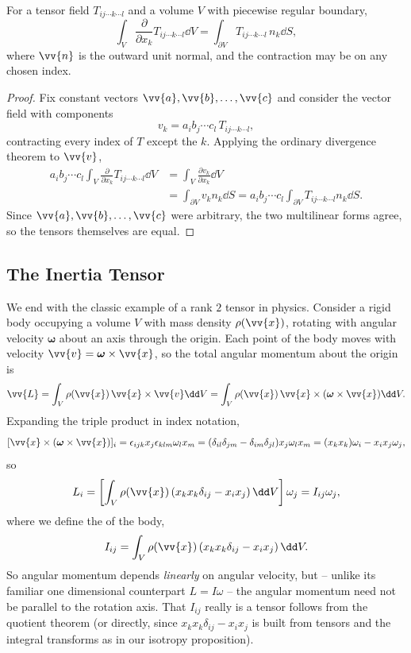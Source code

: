 \begin{theorem}
	For a tensor field $T_{ij \cdots k \cdots l}$ and a volume $V$ with piecewise regular boundary,
	$$
	\int_V \frac{\partial}{\partial x_k} T_{ij\cdots k \cdots l} \dd V = \int_{\partial V} T_{ij \cdots k \cdots l} \, n_k \dd S,
	$$
	where $\vv{n}$ is the outward unit normal, and the contraction may be on any chosen index.
\end{theorem}
\begin{proof}
	Fix constant vectors $\vv{a}, \vv{b}, \dots, \vv{c}$ and consider the vector field with components
	$$
	v_k = a_i b_j \cdots c_l \, T_{ij \cdots k \cdots l},
	$$
	contracting every index of $T$ except the $k$. Applying the ordinary divergence theorem to $\vv{v}$,
	\begin{align*}
		a_i b_j \cdots c_l \int_V \frac{\partial}{\partial x_k} T_{ij \cdots k \cdots l} \dd V &= \int_V \frac{\partial v_k}{\partial x_k} \dd V \\
		&= \int_{\partial V} v_k n_k \dd S = a_i b_j \cdots c_l \int_{\partial V} T_{ij\cdots k \cdots l} n_k \dd S.
	\end{align*}
	Since $\vv{a}, \vv{b}, \dots, \vv{c}$ were arbitrary, the two multilinear forms agree, so the tensors themselves are equal.
\end{proof}

\subsection{The Inertia Tensor}

We end with the classic example of a rank $2$ tensor in physics. Consider a rigid body occupying a volume $V$ with mass density $\rho(\vv{x})$, rotating with angular velocity $\boldsymbol{\omega}$ about an axis through the origin. Each point of the body moves with velocity $\vv{v} = \boldsymbol{\omega} \times \vv{x}$, so the total angular momentum about the origin is
$$
\vv{L} = \int_V \rho(\vv{x}) \, \vv{x} \times \vv{v} \dd V = \int_V \rho(\vv{x}) \, \vv{x} \times (\boldsymbol{\omega} \times \vv{x}) \dd V.
$$
Expanding the triple product in index notation,
$$
[\vv{x} \times (\boldsymbol{\omega} \times \vv{x})]_i = \epsilon_{ijk} x_j \epsilon_{klm} \omega_l x_m = (\delta_{il}\delta_{jm} - \delta_{im}\delta_{jl}) x_j \omega_l x_m = (x_k x_k) \omega_i - x_i x_j \omega_j,
$$
so
$$
L_i = \left[\int_V \rho(\vv{x}) \left(x_k x_k \delta_{ij} - x_i x_j\right) \dd V \right] \omega_j = I_{ij} \omega_j,
$$
where we define the  of the body,
$$
I_{ij} = \int_V \rho(\vv{x}) \left(x_k x_k \delta_{ij} - x_i x_j\right) \dd V.
$$
So angular momentum depends \emph{linearly} on angular velocity, but -- unlike its familiar one dimensional counterpart $L = I\omega$ -- the angular momentum need not be parallel to the rotation axis. That $I_{ij}$ really is a tensor follows from the quotient theorem (or directly, since $x_kx_k\delta_{ij} - x_ix_j$ is built from tensors and the integral transforms as in our isotropy proposition).

